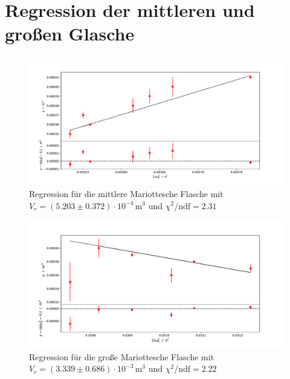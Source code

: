 \documentclass[a4paper, 12pt]{scrartcl}
\begin{document}
\section{Regression der mittleren und großen Glasche}\label{app:reg}
\begin{figure}[H]
\centering
\includegraphics[width=\textwidth]{plots/regression_mittel.pdf}
\caption{Regression für die mittlere Mariottesche Flasche mit $V_r = (5.203 \pm 0.372)\cdot 10^{-4}\,\text{m}^3$ und $\chi^2/\text{ndf} = 2.31$}
\end{figure}
\begin{figure}[H]
\centering
\includegraphics[width=\textwidth]{plots/regression_grosse.pdf}
\caption{Regression für die große Mariottesche Flasche mit $V_r = (3.339 \pm 0.686)\cdot 10^{-3}\,\text{m}^3$ und $\chi^2/\text{ndf} = 2.22$}
\end{figure}
\end{document}
